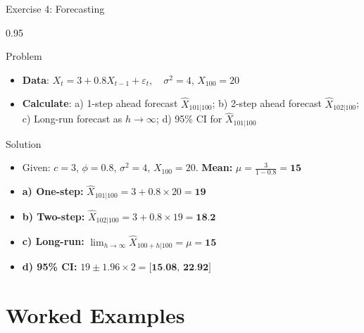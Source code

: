 \documentclass[9pt, aspectratio=169, t]{beamer}
\begin{document}
\begin{frame}{Exercise 4: Forecasting}
    \begin{cminipage}{0.95\textwidth}
    \begin{alertblock}{Problem}
        \begin{itemize}\setlength{\itemsep}{0pt}
            \item \textbf{Data}: $X_t = 3 + 0.8X_{t-1} + \varepsilon_t, \quad \sigma^2 = 4$, $X_{100} = 20$
            \item \textbf{Calculate}: a) 1-step ahead forecast $\hat{X}_{101|100}$; b) 2-step ahead forecast $\hat{X}_{102|100}$; c) Long-run forecast as $h \to \infty$; d) 95\% CI for $\hat{X}_{101|100}$
        \end{itemize}
    \end{alertblock}

    \vspace{0.2cm}
    \begin{exampleblock}{Solution}
        \begin{itemize}\setlength{\itemsep}{0pt}
            \item Given: $c = 3$, $\phi = 0.8$, $\sigma^2 = 4$, $X_{100} = 20$. \textbf{Mean:} $\mu = \frac{3}{1-0.8} = \textbf{15}$
            \item \textbf{a) One-step:} $\hat{X}_{101|100} = 3 + 0.8 \times 20 = \textbf{19}$
            \item \textbf{b) Two-step:} $\hat{X}_{102|100} = 3 + 0.8 \times 19 = \textbf{18.2}$
            \item \textbf{c) Long-run:} $\lim_{h \to \infty} \hat{X}_{100+h|100} = \mu = \textbf{15}$
            \item \textbf{d) 95\% CI:} $19 \pm 1.96 \times 2 = \textbf{[15.08, 22.92]}$
        \end{itemize}
    \end{exampleblock}
    \end{cminipage}
\end{frame}

\section{Worked Examples}
\end{document}
